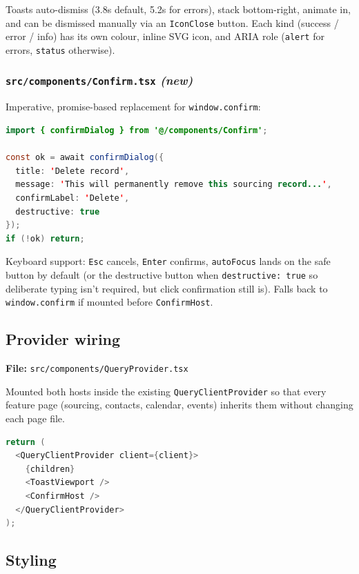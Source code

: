 \documentclass[11pt,a4paper]{article}
\begin{document}
Toasts auto-dismiss (3.8s default, 5.2s for errors), stack
bottom-right, animate in, and can be dismissed manually via an
\texttt{IconClose} button. Each kind (success / error / info) has its own
colour, inline SVG icon, and ARIA role
(\texttt{alert} for errors, \texttt{status} otherwise).

\subsubsection*{\texttt{src/components/Confirm.tsx} \textit{(new)}}

Imperative, promise-based replacement for \texttt{window.confirm}:

\begin{lstlisting}[language=Java]
import { confirmDialog } from '@/components/Confirm';

const ok = await confirmDialog({
  title: 'Delete record',
  message: 'This will permanently remove this sourcing record...',
  confirmLabel: 'Delete',
  destructive: true
});
if (!ok) return;
\end{lstlisting}

Keyboard support: \texttt{Esc} cancels, \texttt{Enter} confirms,
\texttt{autoFocus} lands on the safe button by default
(or the destructive button when \texttt{destructive: true} so deliberate
typing isn't required, but click confirmation still is).
Falls back to \texttt{window.confirm} if mounted before
\texttt{ConfirmHost}.

\subsection{Provider wiring}

\textbf{File:} \texttt{src/components/QueryProvider.tsx}

Mounted both hosts inside the existing \texttt{QueryClientProvider} so
that every feature page (sourcing, contacts, calendar, events) inherits
them without changing each page file.

\begin{lstlisting}[language=Java]
return (
  <QueryClientProvider client={client}>
    {children}
    <ToastViewport />
    <ConfirmHost />
  </QueryClientProvider>
);
\end{lstlisting}

\subsection{Styling}
\end{document}
